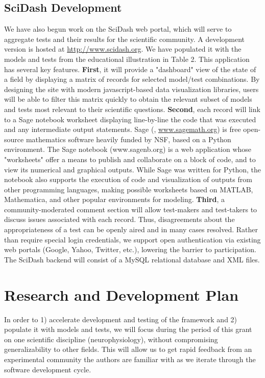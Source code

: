 \documentclass[11pt,letterpaper]{article}
\begin{document}
\subsection{SciDash Development}
We have also begun work on the SciDash web portal, which will serve to aggregate tests and their results for the scientific community. A development version is hosted at \url{http://www.scidash.org}.  We have populated it with the models and tests from the educational illustration in Table 2.  This application has several key features.  \textbf{First}, it will provide a "dashboard" view of the state of a field by displaying a matrix of records for selected model/test combinations.  By designing the site with modern javascript-based data visualization libraries, users will be able to filter this matrix quickly to obtain the relevant subset of models and tests most relevant to their scientific questions.  \textbf{Second}, each record will link to a Sage notebook worksheet displaying line-by-line the code that was executed and any intermediate output statements.  Sage (\cite{stein2005}, \url{www.sagemath.org}) is free open-source mathematics software heavily funded by NSF, based on a Python environment.  The Sage notebook (www.sagenb.org) is a web application whose "worksheets" offer a means to publish and collaborate on a block of code, and to view its numerical and graphical outputs.  While Sage was written for Python, the notebook also supports the execution of code and visualization of outputs from other programming languages, making possible worksheets based on MATLAB, Mathematica, and other popular environments for modeling.  \textbf{Third}, a community-moderated comment section will allow test-makers and test-takers to discuss issues associated with each record.  Thus, disagreements about the appropriateness of a test can be openly aired and in many cases resolved.  Rather than require special login credentials, we support open authentication via existing web portals (Google, Yahoo, Twitter, etc.), lowering the barrier to participation.  The SciDash backend will consist of a MySQL relational database and XML files.  

\section{Research and Development Plan}
In order to 1) accelerate development and testing of the framework and 2) populate it with models and tests, we will focus during the period of this grant on one scientific discipline (neurophysiology), without compromising generalizability to other fields. This will allow us to get rapid feedback from an experimental community the authors are familiar with as we iterate through the software development cycle.  
\end{document}
